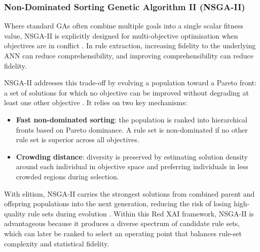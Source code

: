 \subsubsection{Non-Dominated Sorting Genetic Algorithm II (NSGA-II)}

Where standard GAs often combine multiple goals into a single scalar fitness value, NSGA-II is explicitly designed for multi-objective optimisation when objectives are in conflict \citep{deb2002}. In rule extraction, increasing fidelity to the underlying ANN can reduce comprehensibility, and improving comprehensibility can reduce fidelity.

NSGA-II addresses this trade-off by evolving a population toward a Pareto front: a set of solutions for which no objective can be improved without degrading at least one other objective \citep{deb2002}. It relies on two key mechanisms:

\begin{itemize}
\item \textbf{Fast non-dominated sorting}: the population is ranked into hierarchical fronts based on Pareto dominance. A rule set is non-dominated if no other rule set is superior across all objectives.
\item \textbf{Crowding distance}: diversity is preserved by estimating solution density around each individual in objective space and preferring individuals in less crowded regions during selection.
\end{itemize}

With elitism, NSGA-II carries the strongest solutions from combined parent and offspring populations into the next generation, reducing the risk of losing high-quality rule sets during evolution \citep{deb2002}. Within this Red XAI framework, NSGA-II is advantageous because it produces a diverse spectrum of candidate rule sets, which can later be ranked to select an operating point that balances rule-set complexity and statistical fidelity.